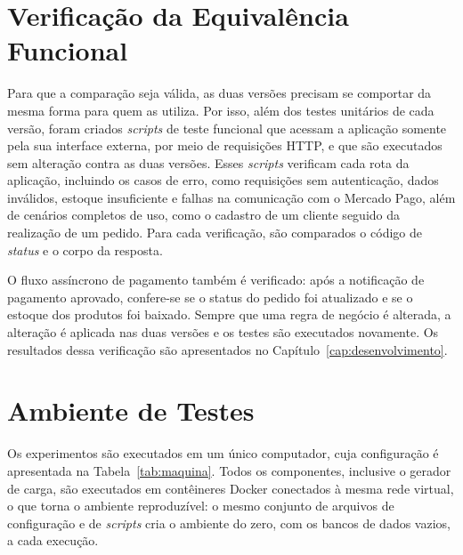 \section{Verificação da Equivalência Funcional}

Para que a comparação seja válida, as duas versões precisam se comportar da mesma forma para
quem as utiliza. Por isso, além dos testes unitários de cada versão, foram criados
\textit{scripts} de teste funcional que acessam a aplicação somente pela sua interface
externa, por meio de requisições HTTP, e que são executados sem alteração contra as duas
versões. Esses \textit{scripts} verificam cada rota da aplicação, incluindo os casos de erro,
como requisições sem autenticação, dados inválidos, estoque insuficiente e falhas na
comunicação com o Mercado Pago, além de cenários completos de uso, como o cadastro de um
cliente seguido da realização de um pedido. Para cada verificação, são comparados o código de
\textit{status} e o corpo da resposta.

O fluxo assíncrono de pagamento também é verificado: após a notificação de pagamento aprovado,
confere-se se o status do pedido foi atualizado e se o estoque dos produtos foi baixado. Sempre
que uma regra de negócio é alterada, a alteração é aplicada nas duas versões e os testes são
executados novamente. Os resultados dessa verificação são apresentados no
Capítulo~\ref{cap:desenvolvimento}.

\section{Ambiente de Testes}

Os experimentos são executados em um único computador, cuja configuração é apresentada na
Tabela~\ref{tab:maquina}. Todos os componentes, inclusive o gerador de carga, são executados
em contêineres Docker conectados à mesma rede virtual, o que torna o ambiente reproduzível: o
mesmo conjunto de arquivos de configuração e de \textit{scripts} cria o ambiente do zero, com
os bancos de dados vazios, a cada execução.

